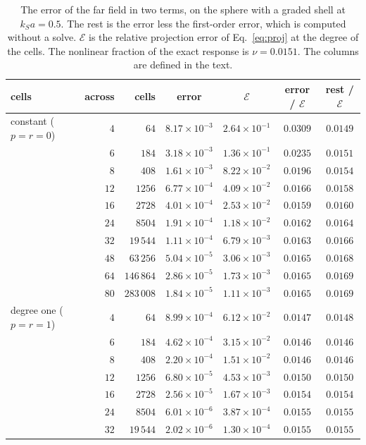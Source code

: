 \documentclass[11pt,a4paper]{article}
\newcommand{\cE}{\mathcal{E}}
\begin{document}
\begin{table}[htbp]
\centering
\caption{The error of the far field in two terms, on the sphere with a graded shell at $k_Sa=0.5$. The
rest is the error less the first-order error, which is computed without a solve. $\cE$ is the relative
projection error of Eq.~\eqref{eq:proj} at the degree of the cells. The nonlinear fraction of the exact
response is $\nu=0.0151$. The columns are defined in the text.}\label{tab:twoterm}
\small
\begin{tabular}{@{}lrrcccc@{}}
\toprule
cells & across & cells & error & $\cE$ & error / $\cE$ & rest / $\cE$ \\
\midrule
constant ($p=r=0$) & $4$ & $64$ & $8.17\times10^{-3}$ & $2.64\times10^{-1}$ & $0.0309$ & $0.0149$ \\
 & $6$  & $184$      & $3.18\times10^{-3}$ & $1.36\times10^{-1}$ & $0.0235$ & $0.0151$ \\
 & $8$  & $408$      & $1.61\times10^{-3}$ & $8.22\times10^{-2}$ & $0.0196$ & $0.0154$ \\
 & $12$ & $1256$     & $6.77\times10^{-4}$ & $4.09\times10^{-2}$ & $0.0166$ & $0.0158$ \\
 & $16$ & $2728$     & $4.01\times10^{-4}$ & $2.53\times10^{-2}$ & $0.0159$ & $0.0160$ \\
 & $24$ & $8504$     & $1.91\times10^{-4}$ & $1.18\times10^{-2}$ & $0.0162$ & $0.0164$ \\
 & $32$ & $19\,544$  & $1.11\times10^{-4}$ & $6.79\times10^{-3}$ & $0.0163$ & $0.0166$ \\
 & $48$ & $63\,256$  & $5.04\times10^{-5}$ & $3.06\times10^{-3}$ & $0.0165$ & $0.0168$ \\
 & $64$ & $146\,864$ & $2.86\times10^{-5}$ & $1.73\times10^{-3}$ & $0.0165$ & $0.0169$ \\
 & $80$ & $283\,008$ & $1.84\times10^{-5}$ & $1.11\times10^{-3}$ & $0.0165$ & $0.0169$ \\
\midrule
degree one ($p=r=1$) & $4$ & $64$ & $8.99\times10^{-4}$ & $6.12\times10^{-2}$ & $0.0147$ & $0.0148$ \\
 & $6$  & $184$     & $4.62\times10^{-4}$ & $3.15\times10^{-2}$ & $0.0146$ & $0.0146$ \\
 & $8$  & $408$     & $2.20\times10^{-4}$ & $1.51\times10^{-2}$ & $0.0146$ & $0.0146$ \\
 & $12$ & $1256$    & $6.80\times10^{-5}$ & $4.53\times10^{-3}$ & $0.0150$ & $0.0150$ \\
 & $16$ & $2728$    & $2.56\times10^{-5}$ & $1.67\times10^{-3}$ & $0.0154$ & $0.0154$ \\
 & $24$ & $8504$    & $6.01\times10^{-6}$ & $3.87\times10^{-4}$ & $0.0155$ & $0.0155$ \\
 & $32$ & $19\,544$ & $2.02\times10^{-6}$ & $1.30\times10^{-4}$ & $0.0155$ & $0.0155$ \\
\bottomrule
\end{tabular}
\end{table}
\end{document}

